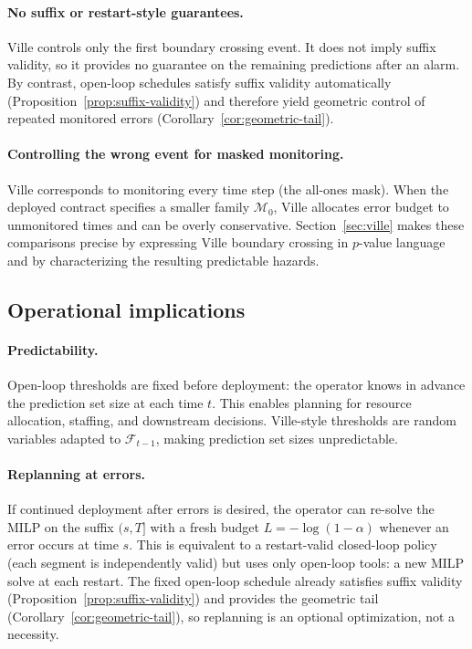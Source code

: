 \documentclass{uai2026} %
\newcommand{\1}{\mathbf{1}}
\newcommand{\F}{\mathcal{F}}
\newcommand{\mcal}{\mathcal{M}}
\begin{document}
\paragraph{No suffix or restart-style guarantees.}
Ville controls only the first boundary crossing event.
It does not imply suffix validity, so it provides no guarantee on the remaining predictions after an alarm.
By contrast, open-loop schedules satisfy suffix validity automatically (Proposition~\ref{prop:suffix-validity}) and therefore yield geometric control of repeated monitored errors (Corollary~\ref{cor:geometric-tail}).

\paragraph{Controlling the wrong event for masked monitoring.}
Ville corresponds to monitoring every time step (the all-ones mask).
When the deployed contract specifies a smaller family $\mcal_{0}$, Ville allocates error budget to unmonitored times and can be overly conservative.
Section~\ref{sec:ville} makes these comparisons precise by expressing Ville boundary crossing in $p$-value language and by characterizing the resulting predictable hazards.

\subsection{Operational implications}
\label{sec:operational}

\paragraph{Predictability.}
Open-loop thresholds are fixed before deployment: the operator knows in advance the prediction set size at each time $t$.
This enables planning for resource allocation, staffing, and downstream decisions.
Ville-style thresholds are random variables adapted to $\F_{t-1}$, making prediction set sizes unpredictable.

\paragraph{Replanning at errors.}
If continued deployment after errors is desired, the operator can re-solve the MILP on the suffix $(s,T]$ with a fresh budget $L=-\log(1-\alpha)$ whenever an error occurs at time $s$.
This is equivalent to a restart-valid closed-loop policy (each segment is independently valid) but uses only open-loop tools: a new MILP solve at each restart.
The fixed open-loop schedule already satisfies suffix validity (Proposition~\ref{prop:suffix-validity}) and provides the geometric tail (Corollary~\ref{cor:geometric-tail}), so replanning is an optional optimization, not a necessity.
\end{document}
